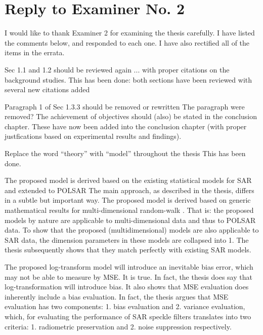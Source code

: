 \section*{Reply to Examiner No. 2}

\begin{replyheader}
\end{replyheader}  

I would like to thank Examiner 2 for examining the thesis carefully. I have listed the comments below, and responded to each one. I have also rectified all of the items in the errata.

\replyToComment
    {Sec 1.1 and 1.2 should be reviewed again ... with proper citations on the background studies.}
    {This has been done: both sections have been reviewed with several new citations added}

\replyToComment
    {Paragraph 1 of Sec 1.3.3 should be removed or rewritten}
    {The paragraph were removed?}
\replyToComment
    {The achievement of objectives should (also) be stated in the conclusion chapter. }
    {These have now been added into the conclusion chapter (with proper justfications based on experimental results and findings).}

\replyToComment
    {Replace the word ``theory'' with ``model'' throughout the thesis}
    {This has been done.}
    
\replyToComment
    {The proposed model is derived based on the existing statistical models for SAR and extended to POLSAR}
    {The main approach, as described in the thesis, differs in a subtle but important way.
The proposed model is derived based on generic mathematical results for multi-dimensional random-walk \cite{Goodman_JOptSocAm_76, Goodman_Springer_1975}.
That is: the proposed models by nature are applicable to multi-dimensional data and thus to POLSAR data.
To show that the proposed (multidimensional) models are also applicable to SAR data, the dimension parameters in these models are collapsed into 1. The thesis subsequently shows that they match perfectly with existing SAR models.
}

\replyToComment
    {The proposed log-transform model will introduce an inevitable bias error, which may not be able to measure by MSE.}
    {
      It is true. In fact, the thesis does say that log-transformation will introduce bias. 
      It also shows that MSE evaluation does inherently include a bias evaluation.
      In fact, the thesis argues that MSE evaluation has two components: 1. bias evaluation and 2. variance evaluation, which, for evaluating the performance of SAR speckle filters translates into two criteria: 1. radiometric preservation and 2. noise suppression respectively.
}

